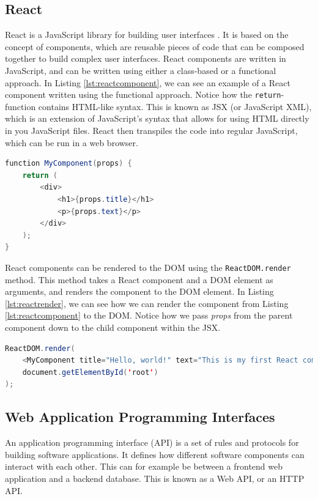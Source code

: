 \documentclass[11pt, a4paper]{article}
\begin{document}
\subsection{React}
\label{sec:react}
React is a JavaScript library for building user interfaces \cite{react}. It is based on the concept of components, which are reusable pieces of code that can be composed together to build complex user interfaces. React components are written in JavaScript, and can be written using either a class-based or a functional approach. In Listing \ref{lst:reactcomponent}, we can see an example of a React component written using the functional approach. Notice how the \texttt{return}-function contains HTML-like syntax. This is known as JSX (or JavaScript XML), which is an extension of JavaScript's syntax that allows for using HTML directly in you JavaScript files. React then transpiles the code into regular JavaScript, which can be run in a web browser.

\begin{lstlisting}[language=java, caption={A React component written using the functional approach.}, label={lst:reactcomponent}]
function MyComponent(props) {
    return (
        <div>
            <h1>{props.title}</h1>
            <p>{props.text}</p>
        </div>
    );
}
\end{lstlisting}

React components can be rendered to the DOM using the \texttt{ReactDOM.render} method. This method takes a React component and a DOM element as arguments, and renders the component to the DOM element. In Listing \ref{lst:reactrender}, we can see how we can render the component from Listing \ref{lst:reactcomponent} to the DOM. Notice how we pass \textit{props} from the parent component down to the child component within the JSX.

\begin{lstlisting}[language=java, caption={Rendering a React component to the DOM.}, label={lst:reactrender}]
ReactDOM.render(
    <MyComponent title="Hello, world!" text="This is my first React component." />,
    document.getElementById('root')
);
\end{lstlisting}

\subsection{Web Application Programming Interfaces}
\label{sec:apis}
An application programming interface (API) is a set of rules and protocols for building software applications. It defines how different software components can interact with each other. This can for example be between a frontend web application and a backend database. This is known as a Web API, or an HTTP API.
\end{document}
